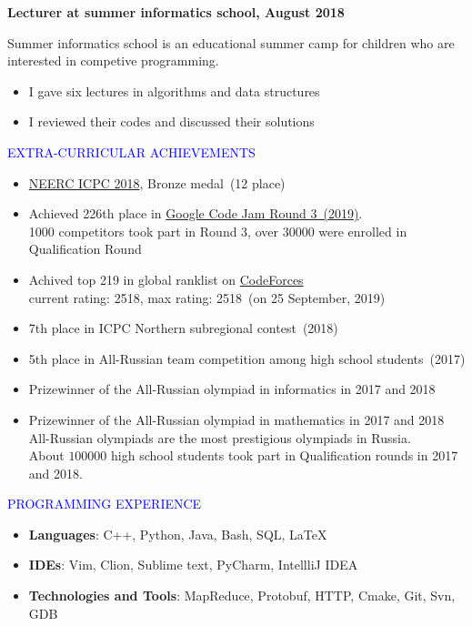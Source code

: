 \documentclass[a4paper,20pt]{report}
\begin{document}
	\textbf{Lecturer at summer informatics school, August 2018} \\[2mm] 
	\par 
	Summer informatics school is an educational summer camp for children who are interested in competive programming.
	\begin{itemize}
		\item I gave six lectures in algorithms and data structures
		\item I reviewed their codes and discussed their solutions
	\end{itemize}	
	
	\begin{center}
		{\LARGE \textcolor{blue}{EXTRA-CURRICULAR ACHIEVEMENTS}}
	\end{center}
	\begin{itemize} 
	\item \href{http://neerc.ifmo.ru/archive/2018/standings.html}{NEERC ICPC 2018}, Bronze medal~(12 place) 
	\item Achieved 226th place in \href{https://codingcompetitions.withgoogle.com/codejam/round/0000000000051707}{ Google Code Jam Round 3~(2019)}.\\
	1000 competitors took part in Round 3, over 30000 were enrolled in Qualification Round
	\item Achived top 219 in global ranklist on \href{https://codeforces.com}{CodeForces} \\
	current rating: 2518, max rating: 2518~(on 25 September, 2019)
	\item 7th place in ICPC Northern subregional contest~(2018)
	\item 5th place in All-Russian team competition among high school students~(2017)   
	\item Prizewinner of the All-Russian olympiad in informatics in 2017 and 2018
	\item Prizewinner of the All-Russian olympiad in mathematics in 2017 and 2018 \\[2mm]
	All-Russian olympiads are the most prestigious olympiads in Russia.\\
	About $100000$ high school students took part in Qualification rounds in 2017 and 2018.
	\end{itemize}

	\begin{center}
		{\LARGE \textcolor{blue}{PROGRAMMING EXPERIENCE}}
	\end{center}
	\begin{itemize}
		\item \textbf{Languages}: C++, Python, Java, Bash, SQL, LaTeX
		\item \textbf{IDEs}: Vim, Clion, Sublime text, PyCharm, IntellliJ IDEA
		\item \textbf{Technologies and Tools}: MapReduce, Protobuf, HTTP, Cmake, Git, Svn, GDB
	\end{itemize}
\end{document}

